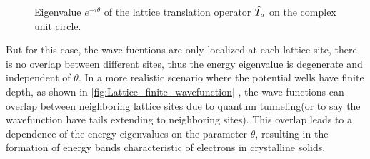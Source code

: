 \begin{figure}[h!]
    \centering
    \caption{Eigenvalue $e^{-i\theta}$ of the lattice translation operator $\hat{T}_a$ on the complex unit circle.}
\end{figure}

But for this case, the wave fucntions are only localized at each lattice site, there is no overlap between different sites, thus the energy eigenvalue is degenerate and independent of $\theta$. In a more realistic scenario where the potential wells have finite depth, as shown in \cref{fig:Lattice_finite_wavefunction} , the wave functions can overlap between neighboring lattice sites due to quantum tunneling(or to say the wavefunction have tails extending to neighboring sites). This overlap leads to a dependence of the energy eigenvalues on the parameter $\theta$, resulting in the formation of energy bands characteristic of electrons in crystalline solids.


